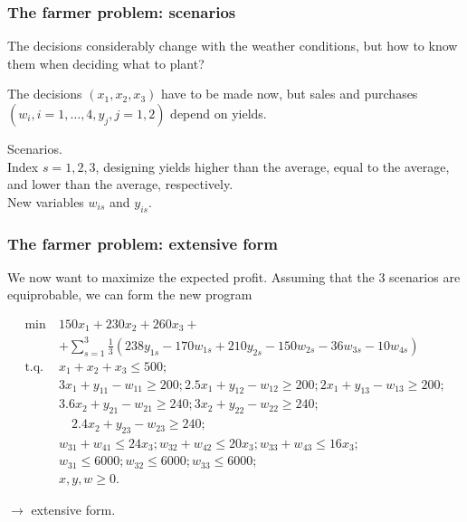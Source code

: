 \documentclass{beamer}
\def\blue{\color{blue}}
\def\red{\color{red}}
\begin{document}
\begin{frame}
\frametitle{The farmer problem: scenarios}

The decisions considerably change with the weather conditions, but how to know them when deciding what to plant?
\mbox{}

The decisions $(x_1, x_2, x_3)$ have to be made now, but sales and purchases $(w_i, i=1,\ldots,4, y_j, j=1,2)$ depend on yields.

\mbox{}

{\blue Scenarios}.\\
Index $s = 1, 2, 3$, designing yields higher than the average, equal to the average, and lower than the average, respectively.\\
New variables $w_{is}$ and $y_{is}$.

\end{frame}

\begin{frame}
\frametitle{The farmer problem: extensive form}

We now want to maximize the {\red expected profit}.
Assuming that the 3 scenarios are equiprobable, we can form the new program
\begin{small}
\begin{align*}
\min\ & 150x_1 + 230x_2 + 260x_3 +\\
&  + \sum_{s = 1}^3 \frac{1}{3}(238y_{1s} - 170w_{1s} + 210y_{2s} - 150w_{2s} -
36w_{3s} - 10w_{4s}) \\
\text{t.q. } & x_1 + x_2 + x_3 \leq 500; \\
& 3x_1 + y_{11} - w_{11} \geq 200; 2.5x_1 + y_{12} - w_{12} \geq 200;
 2x_1 + y_{13} - w_{13} \geq 200; \\
& 3.6x_2 + y_{21} - w_{21} \geq 240; 3x_2 + y_{22} - w_{22} \geq
240;\\
& \quad{} 2.4x_2 + y_{23} - w_{23} \geq 240; \\
& w_{31} + w_{41} \leq 24 x_3; w_{32} + w_{42} \leq 20 x_3; w_{33} +
w_{43} \leq 16 x_3; \\
& w_{31} \leq 6000; w_{32} \leq 6000; w_{33} \leq 6000; \\
& x, y, w \geq 0.
\end{align*}
\end{small}
$\rightarrow$ {\blue extensive form}.

\end{frame}
\end{document}
